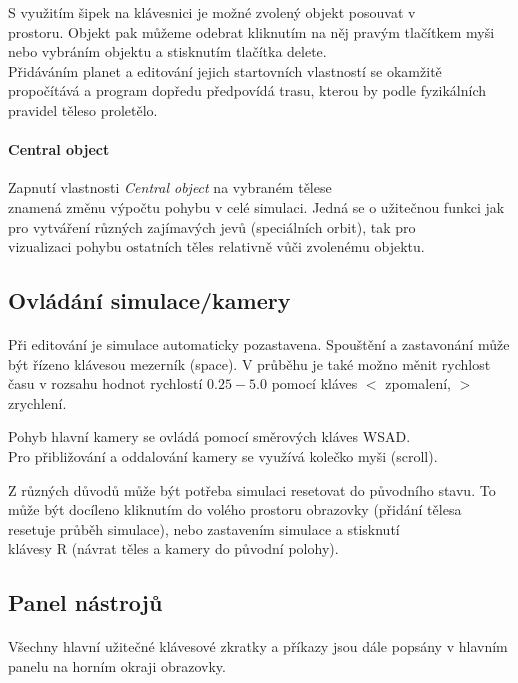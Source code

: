 \documentclass[a4paper, 12pt]{article}
\begin{document}
S využitím šipek na klávesnici je možné zvolený objekt posouvat v
\\prostoru. Objekt pak můžeme odebrat kliknutím na něj pravým tlačítkem myši
nebo vybráním objektu a stisknutím tlačítka delete.\\
\linebreak
Přidáváním planet a editování jejich startovních vlastností se okamžitě
propočítává a program dopředu předpovídá trasu, kterou by podle fyzikálních
pravidel těleso proletělo.

\paragraph{Central object}
Zapnutí vlastnosti \emph{Central object} na vybraném tělese \\znamená změnu
výpočtu pohybu v celé simulaci. Jedná se o užitečnou funkci jak pro vytváření
různých zajímavých jevů (speciálních orbit), tak pro \\vizualizaci pohybu
ostatních těles relativně vůči zvolenému objektu.

\newpage
\subsection{Ovládání simulace/kamery}
\paragraph{}
Při editování je simulace automaticky pozastavena. Spouštění a zastavonání může
být řízeno klávesou mezerník (space). V průběhu je také možno měnit rychlost
času v rozsahu hodnot rychlostí $0.25-5.0$ pomocí kláves $<$ zpomalení, $>$
zrychlení.

Pohyb hlavní kamery se ovládá pomocí směrových kláves WSAD. \\Pro přibližování a
oddalování kamery se využívá kolečko myši (scroll).

Z různých důvodů může být potřeba simulaci resetovat do původního stavu. To
může být docíleno kliknutím do volého prostoru obrazovky (přidání tělesa
resetuje průběh simulace), nebo zastavením simulace a stisknutí\\ klávesy R
(návrat těles a kamery do původní polohy).

\subsection{Panel nástrojů}
\paragraph{}
Všechny hlavní užitečné klávesové zkratky a příkazy jsou dále popsány v hlavním
panelu na horním okraji obrazovky.
\end{document}
